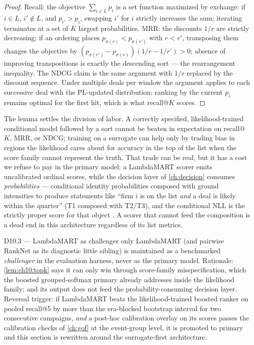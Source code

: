 \begin{proof}
Recall: the objective $\sum_{i \in L} p_i$ is a set function maximized by
exchange: if $i \in L$, $i' \notin L$, and $p_{i'} > p_i$, swapping $i'$
for $i$ strictly increases the sum; iterating terminates at a set of $K$
largest probabilities. MRR: the discounts $1/r$ are strictly decreasing;
if an ordering places $p_{\sigma(r)} < p_{\sigma(r')}$ with $r < r'$,
transposing them changes the objective by $(p_{\sigma(r')} -
p_{\sigma(r)})(1/r - 1/r') > 0$; absence of improving transpositions is
exactly the descending sort --- the rearrangement inequality. The NDCG
claim is the same argument with $1/r$ replaced by the discount sequence.
Under multiple deals per window the argument applies to each successive
deal with the PL-updated distribution; ranking by the current $p_i$
remains optimal for the first hit, which is what recall@$K$ scores.
\end{proof}

The lemma settles the division of labor. A correctly specified,
likelihood-trained conditional model followed by a sort cannot be beaten
in expectation on recall@$K$, MRR, or NDCG; training on a surrogate can
help only by trading bias in regions the likelihood cares about for
accuracy in the top of the list when the score family cannot represent
the truth. That trade can be real, but it has a cost we refuse to pay in
the primary model: a LambdaMART scorer emits uncalibrated ordinal scores,
while the decision layer of \cref{ch:decision} consumes \emph{probabilities}
--- conditional identity probabilities composed with ground intensities
to produce statements like ``firm $i$ is on the list \emph{and} a deal is
likely within the quarter'' (T1 composed with T2/T3), and the conditional
NLL is the strictly proper score for that object
\citep{gneitingraftery2007}. A scorer that cannot feed the composition is
a dead end in this architecture regardless of its list metrics.

\begin{decision}{D10.3 --- LambdaMART as challenger only}
LambdaMART (and pairwise RankNet as its diagnostic little sibling) is
maintained as a benchmarked \emph{challenger} in the evaluation harness,
never as the primary model. Rationale: \cref{lem:ch10:topk} says it can
only win through score-family misspecification, which the boosted
grouped-softmax primary already addresses inside the likelihood family;
and its output does not feed the probability-consuming decision layer.
Reversal trigger: if LambdaMART beats the likelihood-trained boosted
ranker on pooled recall@5 by more than the era-blocked bootstrap interval
for two consecutive campaigns, \emph{and} a post-hoc calibration overlay
\citep{platt1999,zadroznyelkan2002,niculescumizil2005} on its scores
passes the calibration checks of \cref{ch:gof} at the event-group level,
it is promoted to primary and this section is rewritten around the
surrogate-first architecture.
\end{decision}


